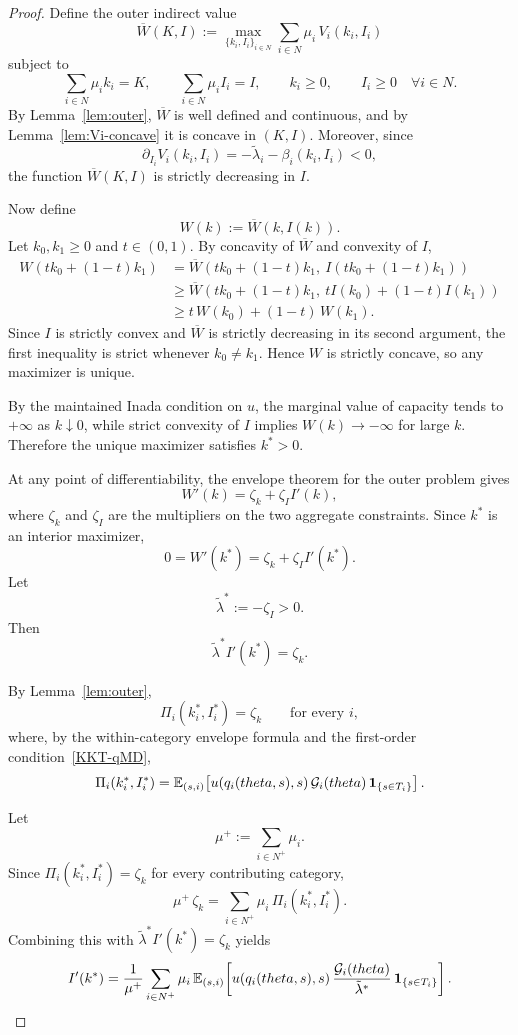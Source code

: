 \documentclass[master.tex]{subfiles}
\begin{document}
\begin{proof}
Define the outer indirect value
\[
\overline W(K,I)
:=
\max_{\{k_i,I_i\}_{i\in N}}
\sum_{i\in N}\mu_i\,V_i(k_i,I_i)
\]
subject to
\[
\sum_{i\in N}\mu_i k_i = K,
\qquad
\sum_{i\in N}\mu_i I_i = I,
\qquad
k_i\geq 0,
\qquad
I_i\geq 0
\quad \forall i\in N.
\]
By Lemma~\ref{lem:outer}, $\overline W$ is well defined and continuous, and by Lemma~\ref{lem:Vi-concave} it is concave in $(K,I)$. Moreover, since
\[
\partial_{I_i}V_i(k_i,I_i)=-\tilde\lambda_i-\beta_i(k_i,I_i)<0,
\]
the function $\overline W(K,I)$ is strictly decreasing in $I$.

Now define
\[
W(k):=\overline W\!\left(k,I(k)\right).
\]
Let $k_0,k_1\geq 0$ and $t\in(0,1)$. By concavity of $\overline W$ and convexity of $I$,
\[
\begin{aligned}
W\!\left(tk_0+(1-t)k_1\right)
&=
\overline W\!\left(tk_0+(1-t)k_1,\ I\!\left(tk_0+(1-t)k_1\right)\right) \\
&\geq
\overline W\!\left(tk_0+(1-t)k_1,\ tI(k_0)+(1-t)I(k_1)\right) \\
&\geq
t\,W(k_0)+(1-t)\,W(k_1).
\end{aligned}
\]
Since $I$ is strictly convex and $\overline W$ is strictly decreasing in its second argument, the first inequality is strict whenever $k_0\neq k_1$. Hence $W$ is strictly concave, so any maximizer is unique.

By the maintained Inada condition on $u$, the marginal value of capacity tends to $+\infty$ as $k\downarrow 0$, while strict convexity of $I$ implies $W(k)\to -\infty$ for large $k$. Therefore the unique maximizer satisfies $k^\ast>0$.

At any point of differentiability, the envelope theorem for the outer problem gives
\[
W'(k)=\zeta_k+\zeta_I I'(k),
\]
where $\zeta_k$ and $\zeta_I$ are the multipliers on the two aggregate constraints. Since $k^\ast$ is an interior maximizer,
\[
0=W'(k^\ast)=\zeta_k+\zeta_I I'(k^\ast).
\]
Let
\[
\tilde\lambda^\ast:=-\zeta_I>0.
\]
Then
\[
\tilde\lambda^\ast I'(k^\ast)=\zeta_k.
\]

By Lemma~\ref{lem:outer},
\[
\Pi_i(k_i^\ast,I_i^\ast)=\zeta_k
\qquad\text{for every }i,
\]
where, by the within-category envelope formula and the first-order condition~\eqref{KKT-qMD},
\[
\Pi_i(k_i^\ast,I_i^\ast)
=
\mathbb{E}_{(s,i)}\!\left[
u(q_i(theta,s),s)\,\mathcal{G}_i(theta)\,\mathbf 1_{\{s\in T_i\}}
\right].
\]

Let
\[
\mu^+ := \sum_{i\in N^+}\mu_i.
\]
Since $\Pi_i(k_i^\ast,I_i^\ast)=\zeta_k$ for every contributing category,
\[
\mu^+\,\zeta_k
=
\sum_{i\in N^+}\mu_i\,\Pi_i(k_i^\ast,I_i^\ast).
\]
Combining this with $\tilde\lambda^\ast I'(k^\ast)=\zeta_k$ yields
\[
I'(k^\ast)
=
\frac{1}{\mu^+}
\sum_{i\in N^+}\mu_i\,
\mathbb{E}_{(s,i)}\!\left[
u(q_i(theta,s),s)\,
\frac{\mathcal{G}_i(theta)}{\tilde\lambda^\ast}\,
\mathbf 1_{\{s\in T_i\}}
\right].
\]


\end{proof}
\end{document}
